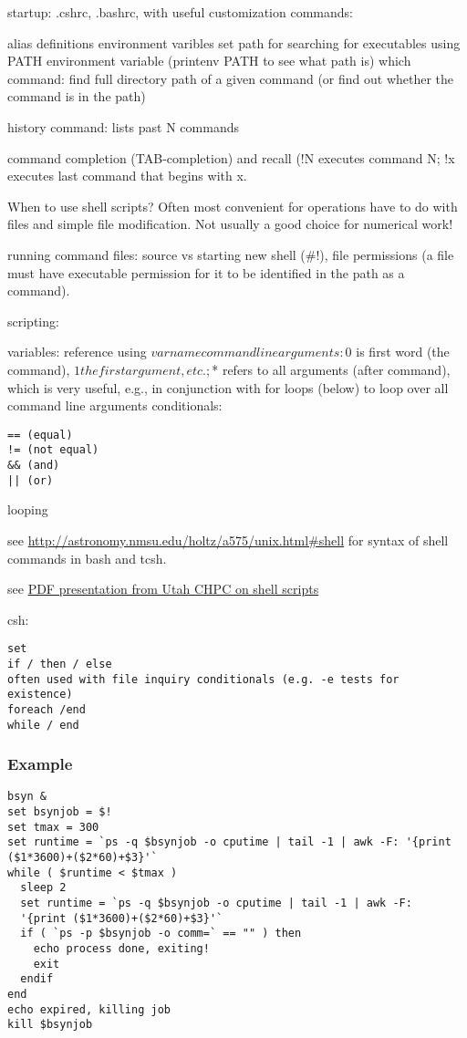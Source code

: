 \documentclass{article}
\begin{document}
startup: .cshrc, .bashrc, with useful customization commands:

alias definitions
environment varibles
set path for searching for executables using PATH environment variable
(printenv PATH to see what path is)
which command: find full directory path of a given command (or find
out whether the command is in the path)

history command: lists past N commands

command completion (TAB-completion) and recall (!N executes command N;
!x executes last command that begins with x.

When to use shell scripts? Often most convenient for operations have
to do with files and simple file modification. Not usually a good
choice for numerical work!

running command files: source vs starting new shell (\#!), file
permissions (a file must have executable permission for it to be
identified in the path as a command).

scripting:

variables: reference using $varname
command line arguments: $0 is first word (the command), $1 the first
argument, etc.; $* refers to all arguments (after command), which is
very useful, e.g., in conjunction with for loops (below) to loop over
all command line arguments
conditionals:
\begin{verbatim}
== (equal)
!= (not equal)
&& (and)
|| (or)
\end{verbatim}
looping

see \url{http://astronomy.nmsu.edu/holtz/a575/unix.html#shell}
for syntax of shell commands in bash and tcsh.

see
\href{http://astronomy.nmsu.edu/holtz/a575/IntroScriptingJuly2015.pdf}
{PDF presentation from Utah CHPC on shell scripts}

csh:
\begin{verbatim}
set
if / then / else
often used with file inquiry conditionals (e.g. -e tests for
existence)
foreach /end
while / end
\end{verbatim}


\subsubsection{Example}

\begin{verbatim}
bsyn &
set bsynjob = $!
set tmax = 300
set runtime = `ps -q $bsynjob -o cputime | tail -1 | awk -F: '{print ($1*3600)+($2*60)+$3}'`
while ( $runtime < $tmax )
  sleep 2
  set runtime = `ps -q $bsynjob -o cputime | tail -1 | awk -F:
  '{print ($1*3600)+($2*60)+$3}'`
  if ( `ps -p $bsynjob -o comm=` == "" ) then
    echo process done, exiting!
    exit
  endif
end
echo expired, killing job
kill $bsynjob
\end{verbatim}
\end{document}
